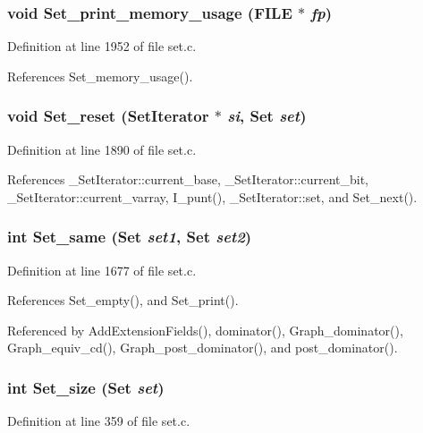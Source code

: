 \subsubsection{\setlength{\rightskip}{0pt plus 5cm}void Set\_\-print\_\-memory\_\-usage (FILE $\ast$ {\em fp})}\label{set_8c_3d68b91746006f716d89e06c1dbbecd1}




Definition at line 1952 of file set.c.

References Set\_\-memory\_\-usage().
\subsubsection{\setlength{\rightskip}{0pt plus 5cm}void Set\_\-reset (\bf{Set\-Iterator} $\ast$ {\em si}, \bf{Set} {\em set})}\label{set_8c_ae1fabcddf34263afd4a30dd1690f023}




Definition at line 1890 of file set.c.

References \_\-Set\-Iterator::current\_\-base, \_\-Set\-Iterator::current\_\-bit, \_\-Set\-Iterator::current\_\-varray, I\_\-punt(), \_\-Set\-Iterator::set, and Set\_\-next().
\subsubsection{\setlength{\rightskip}{0pt plus 5cm}int Set\_\-same (\bf{Set} {\em set1}, \bf{Set} {\em set2})}\label{set_8c_6fb47bcc6f7b9856c0951827c1adc781}




Definition at line 1677 of file set.c.

References Set\_\-empty(), and Set\_\-print().

Referenced by Add\-Extension\-Fields(), dominator(), Graph\_\-dominator(), Graph\_\-equiv\_\-cd(), Graph\_\-post\_\-dominator(), and post\_\-dominator().
\subsubsection{\setlength{\rightskip}{0pt plus 5cm}int Set\_\-size (\bf{Set} {\em set})}\label{set_8c_0d0f96bfb3d7dd514abc07b743915da4}




Definition at line 359 of file set.c.

